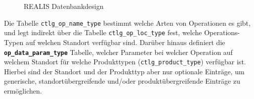 \begin{figure}[!htbp]
    \centering
    \caption{REALIS Datenbankdesign}
    \label{fig:realis-datenbankdesign}
\end{figure}

Die Tabelle \texttt{ctlg\_op\_name\_type} bestimmt welche Arten von Operationen es gibt, und legt indirekt über die Tabelle \texttt{ctlg\_op\_loc\_type} fest, welche Operations-Typen auf welchen Standort verfügbar sind. Darüber hinaus definiert die 
\textbf{\texttt{op\_data\_param\_\-type}} Tabelle, welcher Parameter bei welcher Operation auf welchem Standort für welche Produkttypen (\texttt{ctlg\_product\_type}) verfügbar ist. Hierbei sind der Standort und der Produkttyp aber nur optionale Einträge, um generische, standortübergreifende und/oder produktübergreifende Einträge zu ermöglichen.

